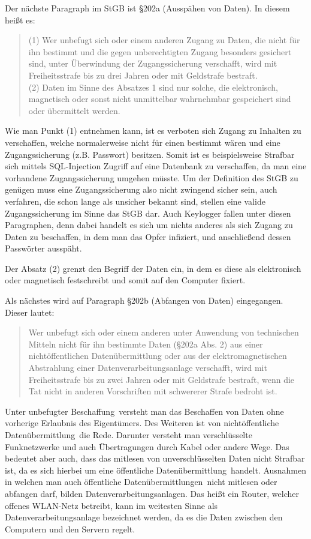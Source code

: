 \documentclass[10pt,a4paper]{article}
\begin{document}
Der nächste Paragraph im StGB ist §202a (Ausspähen von Daten). In diesem heißt es:
\begin{quote}
(1) Wer unbefugt sich oder einem anderen Zugang zu Daten, die nicht für ihn bestimmt und die gegen unberechtigten Zugang besonders gesichert sind, unter Überwindung der Zugangssicherung verschafft, wird mit Freiheitsstrafe bis zu drei Jahren oder mit Geldstrafe bestraft.\\
(2) Daten im Sinne des Absatzes 1 sind nur solche, die elektronisch, magnetisch oder sonst nicht unmittelbar wahrnehmbar gespeichert sind oder übermittelt werden.
\end{quote}

Wie man Punkt (1) entnehmen kann, ist es verboten sich Zugang zu Inhalten zu verschaffen, welche normalerweise nicht für einen bestimmt wären und eine Zugangssicherung (z.B. Passwort) besitzen. Somit ist es beispielsweise Strafbar sich mittels SQL-Injection Zugriff auf eine Datenbank zu verschaffen, da man eine vorhandene Zugangssicherung umgehen müsste. Um der Definition des StGB zu genügen muss eine Zugangssicherung also nicht zwingend sicher sein, auch verfahren, die schon lange als unsicher bekannt sind, stellen eine valide Zugangssicherung im Sinne das StGB dar. Auch Keylogger fallen unter diesen Paragraphen, denn dabei handelt es sich um nichts anderes als sich Zugang zu Daten zu beschaffen, in dem man das Opfer infiziert, und anschließend dessen Passwörter ausspäht. 

Der Absatz (2) grenzt den Begriff der Daten ein, in dem es diese als elektronisch oder magnetisch festschreibt und somit auf den Computer fixiert. 

Als nächstes wird auf Paragraph §202b (Abfangen von Daten) eingegangen. Dieser lautet:
\begin{quote}
Wer unbefugt sich oder einem anderen unter Anwendung von technischen Mitteln nicht für ihn bestimmte Daten (§202a Abs. 2) aus einer nichtöffentlichen Datenübermittlung oder aus der elektromagnetischen Abstrahlung einer Datenverarbeitungsanlage verschafft, wird mit Freiheitsstrafe bis zu zwei Jahren oder mit Geldstrafe bestraft, wenn die Tat nicht in anderen Vorschriften mit schwererer Strafe bedroht ist.
\end{quote}
Unter \glqq unbefugter Beschaffung\grqq \ versteht man das Beschaffen von Daten ohne vorherige Erlaubnis des Eigentümers. Des Weiteren ist von \glqq nichtöffentliche Datenübermittlung\grqq\ die Rede. Darunter versteht man verschlüsselte Funknetzwerke und auch Übertragungen durch Kabel oder andere Wege. Das bedeutet aber auch, dass das mitlesen von unverschlüsselten Daten nicht Strafbar ist, da es sich hierbei um eine \glqq öffentliche Datenübermittlung\grqq \ handelt. Ausnahmen in welchen man auch \glqq öffentliche Datenübermittlungen\grqq \  nicht mitlesen oder abfangen darf, bilden Datenverarbeitungsanlagen. Das heißt ein Router, welcher offenes WLAN-Netz betreibt, kann im weitesten Sinne als Datenverarbeitungsanlage bezeichnet werden, da es die Daten zwischen den Computern und den Servern regelt.
\end{document}
